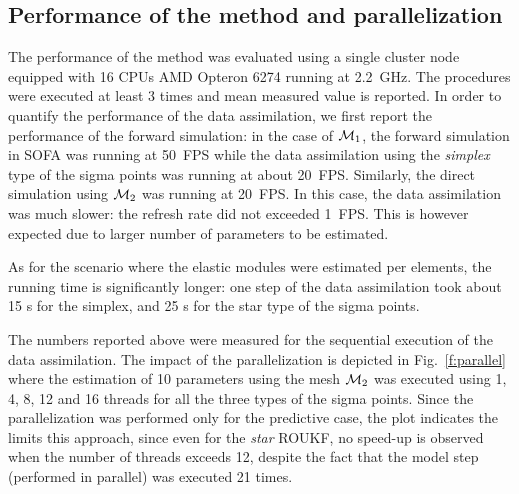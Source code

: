 \subsection{Performance of the method and parallelization}
\label{sr:perf}
The performance of the method was evaluated using a single cluster node equipped with 16 CPUs AMD Opteron 6274 running at \SI{2.2}{\giga\hertz}.
The procedures were executed at least 3 times and mean measured value is reported. 
In order to quantify the performance of the data assimilation, we first report the performance of the 
forward simulation: in the case of $\mathcal{M}_1$, the forward simulation in SOFA was running at \SI{50}{FPS} while the data assimilation using the 
\emph{simplex} type of the sigma points was running at about \SI{20}{FPS}. Similarly, the direct simulation using $\mathcal{M}_2$ 
was running at \SI{20}{FPS}. In this case, the data assimilation was much slower: the refresh rate did not exceeded \SI{1}{FPS}. This 
is however expected due to larger number of parameters to be estimated.

As for the scenario where the elastic modules were estimated per elements, the running time is significantly longer: one step of the data assimilation 
took about 15 s for the simplex, and 25 s for the star type of the sigma points. 

The numbers reported above were measured for the sequential execution of the data assimilation. The impact of the parallelization 
is depicted in Fig.~\ref{f:parallel} where the estimation of 10 parameters using the mesh $\mathcal{M}_2$ was executed using 1, 4, 8, 12 and 16 threads
for all the three types of the sigma points. Since the parallelization was performed only for the predictive case, the plot 
indicates the limits this approach, since even for the \emph{star} ROUKF, no speed-up is observed when the number of threads exceeds 12, 
despite the fact that the model step (performed in parallel) was executed 21 times. 
